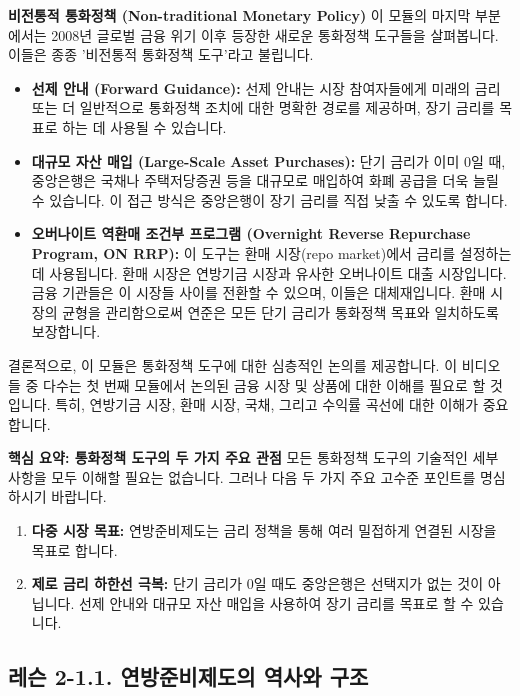 \documentclass[11pt,a4paper]{article}
\theoremstyle{definition}
\begin{document}
\begin{conceptbox}
\textbf{비전통적 통화정책 (Non-traditional Monetary Policy)}
이 모듈의 마지막 부분에서는 2008년 글로벌 금융 위기 이후 등장한 새로운 통화정책 도구들을 살펴봅니다. 이들은 종종 '비전통적 통화정책 도구'라고 불립니다.
\begin{itemize}
    \item \textbf{선제 안내 (Forward Guidance):} 선제 안내는 시장 참여자들에게 미래의 금리 또는 더 일반적으로 통화정책 조치에 대한 명확한 경로를 제공하며, 장기 금리를 목표로 하는 데 사용될 수 있습니다.
    \item \textbf{대규모 자산 매입 (Large-Scale Asset Purchases):} 단기 금리가 이미 0일 때, 중앙은행은 국채나 주택저당증권 등을 대규모로 매입하여 화폐 공급을 더욱 늘릴 수 있습니다. 이 접근 방식은 중앙은행이 장기 금리를 직접 낮출 수 있도록 합니다.
    \item \textbf{오버나이트 역환매 조건부 프로그램 (Overnight Reverse Repurchase Program, ON RRP):} 이 도구는 환매 시장(repo market)에서 금리를 설정하는 데 사용됩니다. 환매 시장은 연방기금 시장과 유사한 오버나이트 대출 시장입니다. 금융 기관들은 이 시장들 사이를 전환할 수 있으며, 이들은 대체재입니다. 환매 시장의 균형을 관리함으로써 연준은 모든 단기 금리가 통화정책 목표와 일치하도록 보장합니다.
\end{itemize}
\end{conceptbox}

결론적으로, 이 모듈은 통화정책 도구에 대한 심층적인 논의를 제공합니다. 이 비디오들 중 다수는 첫 번째 모듈에서 논의된 금융 시장 및 상품에 대한 이해를 필요로 할 것입니다. 특히, 연방기금 시장, 환매 시장, 국채, 그리고 수익률 곡선에 대한 이해가 중요합니다.

\begin{summarybox}
\textbf{핵심 요약: 통화정책 도구의 두 가지 주요 관점}
모든 통화정책 도구의 기술적인 세부 사항을 모두 이해할 필요는 없습니다. 그러나 다음 두 가지 주요 고수준 포인트를 명심하시기 바랍니다.
\begin{enumerate}
    \item \textbf{다중 시장 목표:} 연방준비제도는 금리 정책을 통해 여러 밀접하게 연결된 시장을 목표로 합니다.
    \item \textbf{제로 금리 하한선 극복:} 단기 금리가 0일 때도 중앙은행은 선택지가 없는 것이 아닙니다. 선제 안내와 대규모 자산 매입을 사용하여 장기 금리를 목표로 할 수 있습니다.
\end{enumerate}
\end{summarybox}

\newpage
\subsection{레슨 2-1.1. 연방준비제도의 역사와 구조}
\end{document}
